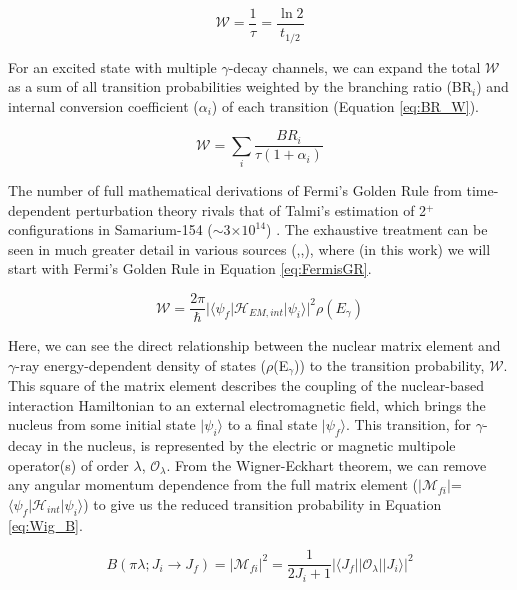 \begin{equation}\label{eq:life_halflife}
\mathcal{W}=\frac{1}{\tau}=\frac{\ln2}{t_{1/2}}
\end{equation}

For an excited state with multiple $\gamma$-decay channels, we can expand the total $\mathcal{W}$ as a sum of all transition probabilities weighted by the branching ratio (BR$_i$) and internal conversion coefficient ($\alpha_i$) of each transition (Equation \ref{eq:BR_W}).

\begin{equation}\label{eq:BR_W}
\mathcal{W}=\sum_i\frac{BR_i}{\tau(1+\alpha_i)}
\end{equation}

The number of full mathematical derivations of Fermi's Golden Rule from time-dependent perturbation theory rivals that of Talmi's estimation of 2$^+$ configurations in Samarium-154 ($\sim$3$\times10^{14}$) \cite{Casten_text}. The exhaustive treatment can be seen in much greater detail in various sources (\cite{Wong_text},\cite{Heyde_text},\cite{BlattWeiss_text}), where (in this work) we will start with Fermi's Golden Rule \cite{Wong_text} in Equation \ref{eq:FermisGR}.

\begin{equation}\label{eq:FermisGR}
\mathcal{W}=\frac{2\pi}{\hbar}\vert\langle\psi_f\vert \mathcal{H}_{EM,int}\vert\psi_i\rangle\vert^2\rho(E_\gamma)
\end{equation}

Here, we can see the direct relationship between the nuclear matrix element and $\gamma$-ray energy-dependent density of states ($\rho$(E$_\gamma$)) to the transition probability, $\mathcal{W}$. This square of the matrix element describes the coupling of the nuclear-based interaction Hamiltonian to an external electromagnetic field, which brings the nucleus from some initial state $\vert\psi_i\rangle$ to a final state $\vert\psi_f\rangle$. This transition, for $\gamma$-decay in the nucleus, is represented by the electric or magnetic multipole operator(s) of order $\lambda$, $\mathcal{O}_{\lambda}$. From the Wigner-Eckhart theorem, we can remove any angular momentum dependence from the full matrix element ($\vert\mathcal{M}_{fi}\vert$=$\langle\psi_f\vert \mathcal{H}_{int}\vert\psi_i\rangle$) to give us the reduced transition probability in Equation \ref{eq:Wig_B}.

\begin{equation}\label{eq:Wig_B}
  B(\pi\lambda;J_i\rightarrow J_f)=\vert \mathcal{M}_{fi}\vert^2=\frac{1}{2J_i+1}\vert\langle J_f\vert\vert \mathcal{O}_{\lambda}\vert\vert J_i\rangle\vert^2
\end{equation}

